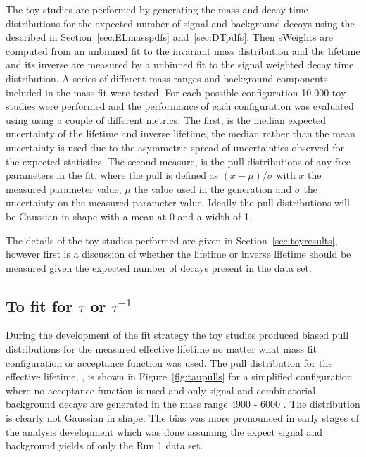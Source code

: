 {The toy studies are performed by generating the mass and decay time distributions for the expected number of signal and background decays using the \pdfs described in Section~\ref{sec:ELmasspdfs} and~\ref{sec:DTpdfs}. Then sWeights are computed from an unbinned \ml fit to the invariant mass distribution and the lifetime and its inverse are measured by a unbinned \ml fit to the signal weighted decay time distribution. A series of different mass ranges and background components included in the mass fit were tested. For each possible configuration 10,000 toy studies were performed and the performance of each configuration was evaluated using using a couple of different metrics. The first, is the median expected uncertainty of the \bsmumu lifetime and inverse lifetime, the median rather than the mean uncertainty is used due to the asymmetric spread of uncertainties observed for the expected statistics. The second measure, is the pull distributions of any free parameters in the fit, where the pull is defined as $(x - \mu)/\sigma$ with $x$ the measured parameter value, $\mu$ the value used in the generation and $\sigma$ the uncertainty on the measured parameter value. Ideally the pull distributions will be Gaussian in shape with a mean at 0 and a width of 1.

 The details of the toy studies performed are given in Section~\ref{sec:toyresults}, however first is a discussion of whether the \bsmumu lifetime or inverse lifetime should be measured given the expected number of decays present in the data set.  

\subsection{To fit for $\tau$ or $\tau^{-1}$}
\label{sec:tauORinvtau}
During the development of the fit strategy the toy studies produced biased pull distributions for the measured \bsmumu effective lifetime no matter what mass fit configuration or acceptance function was used. The pull distribution for the effective lifetime, \tmumu, is shown in Figure~\ref{fig:taupulls} for a simplified configuration where no acceptance function is used and only signal and combinatorial background decays are generated in the mass range 4900 - 6000 \mevcc. The distribution is clearly not Gaussian in shape. The bias was more pronounced in early stages of the analysis development which was done assuming the expect signal and background yields of only the Run 1 data set. 

}
